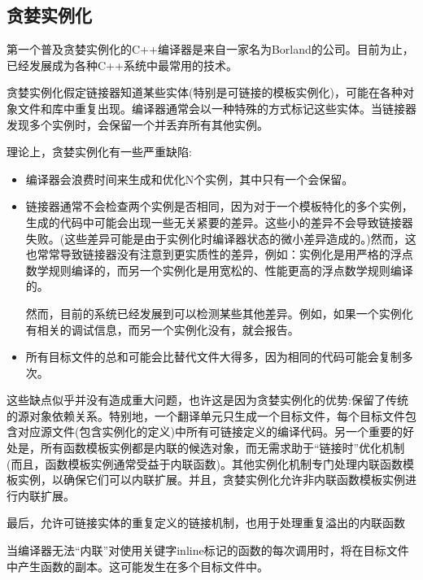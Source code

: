 \subsection{贪婪实例化}

第一个普及贪婪实例化的C++编译器是来自一家名为Borland的公司。目前为止，已经发展成为各种C++系统中最常用的技术。

贪婪实例化假定链接器知道某些实体(特别是可链接的模板实例化)，可能在各种对象文件和库中重复出现。编译器通常会以一种特殊的方式标记这些实体。当链接器发现多个实例时，会保留一个并丢弃所有其他实例。

理论上，贪婪实例化有一些严重缺陷:

\begin{itemize}
\item 
编译器会浪费时间来生成和优化N个实例，其中只有一个会保留。

\item 
链接器通常不会检查两个实例是否相同，因为对于一个模板特化的多个实例，生成的代码中可能会出现一些无关紧要的差异。这些小的差异不会导致链接器失败。(这些差异可能是由于实例化时编译器状态的微小差异造成的。)然而，这也常常导致链接器没有注意到更实质性的差异，例如：实例化是用严格的浮点数学规则编译的，而另一个实例化是用宽松的、性能更高的浮点数学规则编译的。

\begin{tcolorbox}[colback=webgreen!5!white,colframe=webgreen!75!black]
\hspace*{0.75cm}然而，目前的系统已经发展到可以检测某些其他差异。例如，如果一个实例化有相关的调试信息，而另一个实例化没有，就会报告。
\end{tcolorbox}

\item 
所有目标文件的总和可能会比替代文件大得多，因为相同的代码可能会复制多次。
\end{itemize}

这些缺点似乎并没有造成重大问题，也许这是因为贪婪实例化的优势:保留了传统的源对象依赖关系。特别地，一个翻译单元只生成一个目标文件，每个目标文件包含对应源文件(包含实例化的定义)中所有可链接定义的编译代码。另一个重要的好处是，所有函数模板实例都是内联的候选对象，而无需求助于“链接时”优化机制(而且，函数模板实例通常受益于内联函数)。其他实例化机制专门处理内联函数模板实例，以确保它们可以内联扩展。并且，贪婪实例化允许非内联函数模板实例进行内联扩展。

最后，允许可链接实体的重复定义的链接机制，也用于处理重复溢出的内联函数

\begin{tcolorbox}[colback=webgreen!5!white,colframe=webgreen!75!black]
\hspace*{0.75cm}当编译器无法“内联”对使用关键字inline标记的函数的每次调用时，将在目标文件中产生函数的副本。这可能发生在多个目标文件中。
\end{tcolorbox}

